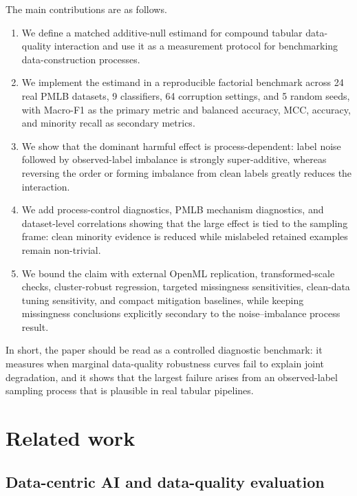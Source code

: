 \documentclass[preprint,12pt,number]{elsarticle}
\begin{document}
The main contributions are as follows.
\begin{enumerate}
    \item We define a matched additive-null estimand for compound tabular data-quality interaction and use it as a measurement protocol for benchmarking data-construction processes.
    \item We implement the estimand in a reproducible factorial benchmark across 24 real PMLB datasets, 9 classifiers, 64 corruption settings, and 5 random seeds, with Macro-F1 as the primary metric and balanced accuracy, MCC, accuracy, and minority recall as secondary metrics.
    \item We show that the dominant harmful effect is process-dependent: label noise followed by observed-label imbalance is strongly super-additive, whereas reversing the order or forming imbalance from clean labels greatly reduces the interaction.
    \item We add process-control diagnostics, PMLB mechanism diagnostics, and dataset-level correlations showing that the large effect is tied to the sampling frame: clean minority evidence is reduced while mislabeled retained examples remain non-trivial.
    \item We bound the claim with external OpenML replication, transformed-scale checks, cluster-robust regression, targeted missingness sensitivities, clean-data tuning sensitivity, and compact mitigation baselines, while keeping missingness conclusions explicitly secondary to the noise--imbalance process result.
\end{enumerate}

In short, the paper should be read as a controlled diagnostic benchmark: it measures when marginal data-quality robustness curves fail to explain joint degradation, and it shows that the largest failure arises from an observed-label sampling process that is plausible in real tabular pipelines.

\section{Related work}

\subsection{Data-centric AI and data-quality evaluation}
\end{document}
